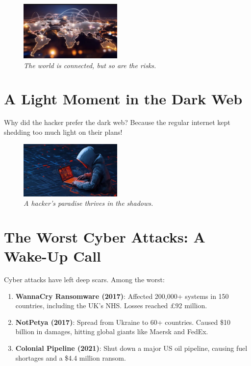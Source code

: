 \documentclass[a4paper,10pt,twocolumn]{memoir}
\begin{document}
\begin{figure}[h]
  \centering
  \includegraphics[width=0.45\textwidth]{world.png}
  \caption{\textit{The world is connected, but so are the risks.}}
\end{figure}

\section*{A Light Moment in the Dark Web}
Why did the hacker prefer the dark web? Because the regular internet kept shedding too much light on their plans!

\begin{figure}[h]
  \centering
  \includegraphics[width=0.45\textwidth]{hacker.png}
  \caption{\textit{A hacker's paradise thrives in the shadows.}}
\end{figure}

\section*{The Worst Cyber Attacks: A Wake-Up Call}
Cyber attacks have left deep scars. Among the worst:

\begin{enumerate}[label=\arabic*.]
  \item \textbf{WannaCry Ransomware (2017)}: Affected 200,000+ systems in 150 countries, including the UK’s NHS. Losses reached £92 million.
  \item \textbf{NotPetya (2017)}: Spread from Ukraine to 60+ countries. Caused \$10 billion in damages, hitting global giants like Maersk and FedEx.
  \item \textbf{Colonial Pipeline (2021)}: Shut down a major US oil pipeline, causing fuel shortages and a \$4.4 million ransom.
\end{enumerate}
\end{document}
